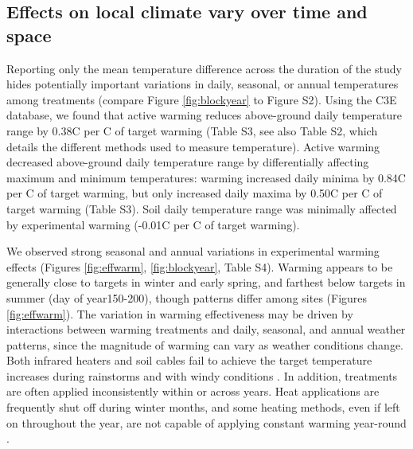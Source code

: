 \documentclass{article}
\begin{document}
\subsection* {Effects on local climate vary over time and space}
Reporting only the mean temperature difference across the duration of the study hides potentially important variations in daily, seasonal, or annual temperatures among treatments (compare Figure \ref{fig:blockyear} to Figure S2). Using the C3E database, we found that active warming reduces above-ground daily temperature range by 0.38\degree C per \degree C of target warming (Table S3, see also Table S2, which details the different methods used to measure temperature). Active warming decreased above-ground daily temperature range by differentially affecting maximum and minimum temperatures: warming increased daily minima by 0.84\degree C per \degree C of target warming, but only increased daily maxima by 0.50\degree C per \degree C of target warming (Table S3). Soil daily temperature range was minimally affected by experimental warming (-0.01\degree C per \degree C of target warming).%
\par We observed strong seasonal and annual variations in experimental warming effects (Figures \ref{fig:effwarm}, \ref{fig:blockyear}, Table S4). Warming appears to be generally close to targets in winter and early spring, and farthest below targets in summer (day of year150-200), though patterns differ among sites (Figures \ref{fig:effwarm}). 
The variation in warming effectiveness may be driven by interactions between warming treatments and daily, seasonal, and annual weather patterns, since the magnitude of warming can vary as weather conditions change.  Both infrared heaters and soil cables fail to achieve the target temperature increases during rainstorms \citep{peterjohn1993,hoeppner2012} and with windy conditions \citep{kimball2005,kimball2008}. In addition, treatments are often applied inconsistently within or across years. Heat applications are frequently shut off during winter months, and some heating methods, even if left on throughout the year, are not capable of applying constant warming year-round \citep[e.g.][]{clark2014a,clark2014b,hagedorn2010}.
\end{document}
